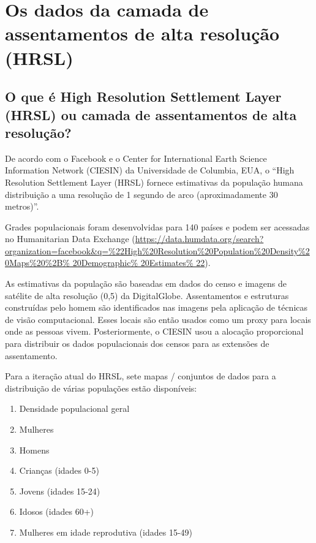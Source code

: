 \documentclass[
]{krantz}
\providecommand{\tightlist}{%
  \setlength{\itemsep}{0pt}\setlength{\parskip}{0pt}}
\begin{document}
\hypertarget{os-dados-da-camada-de-assentamentos-de-alta-resoluuxe7uxe3o-hrsl}{%
\section{Os dados da camada de assentamentos de alta resolução (HRSL)}\label{os-dados-da-camada-de-assentamentos-de-alta-resoluuxe7uxe3o-hrsl}}

\hypertarget{o-que-uxe9-high-resolution-settlement-layer-hrsl-ou-camada-de-assentamentos-de-alta-resoluuxe7uxe3o}{%
\subsection{O que é High Resolution Settlement Layer (HRSL) ou camada de assentamentos de alta resolução?}\label{o-que-uxe9-high-resolution-settlement-layer-hrsl-ou-camada-de-assentamentos-de-alta-resoluuxe7uxe3o}}

De acordo com o Facebook e o Center for International Earth Science Information Network (CIESIN) da Universidade de Columbia, EUA, o ``High Resolution Settlement Layer (HRSL) fornece estimativas da população humana distribuição a uma resolução de 1 segundo de arco (aproximadamente 30 metros)''.

Grades populacionais foram desenvolvidas para 140 países e podem ser acessadas no Humanitarian Data Exchange (\href{https://data.humdata.org/search?organization=facebook\&q=\%22High\%20Resolution\%20Population\%20Density\%20Maps\%20\%2B\%20Demographic\%20Estimates\%22}{https://data.humdata.org/search?organization=facebook\&q=\%22High\%20Resolution\%20Population\%20Density\%20Maps\%20\%2B\% 20Demographic\% 20Estimates\% 22}).

As estimativas da população são baseadas em dados do censo e imagens de satélite de alta resolução (0,5) da DigitalGlobe. Assentamentos e estruturas construídas pelo homem são identificados nas imagens pela aplicação de técnicas de visão computacional. Esses locais são então usados como um proxy para locais onde as pessoas vivem. Posteriormente, o CIESIN usou a alocação proporcional para distribuir os dados populacionais dos censos para as extensões de assentamento.

Para a iteração atual do HRSL, sete mapas / conjuntos de dados para a distribuição de várias populações estão disponíveis:

\begin{enumerate}
\def\labelenumi{\arabic{enumi}.}
\tightlist
\item
  Densidade populacional geral
\item
  Mulheres
\item
  Homens
\item
  Crianças (idades 0-5)
\item
  Jovens (idades 15-24)
\item
  Idosos (idades 60+)
\item
  Mulheres em idade reprodutiva (idades 15-49)
\end{enumerate}
\end{document}
